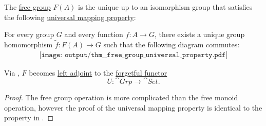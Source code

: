 \begin{theorem}\label{thm:free_group_universal_property}
  The \hyperref[def:free_group]{free group} \( F(A) \) is the unique up to an isomorphism group that satisfies the following \hyperref[rem:universal_mapping_property]{universal mapping property}:
  \begin{displayquote}
    For every group \( G \) and every function \( f: A \to G \), there exists a unique group homomorphism \( \widetilde{f}: F(A) \to G \) such that the following diagram commutes:
    \begin{equation}\label{eq:thm:free_group_universal_property/diagram}
      \begin{aligned}
        \texttt{[image: output/thm\_\_free\_group\_universal\_property.pdf]}
      \end{aligned}
    \end{equation}
  \end{displayquote}

  Via , \( F \) becomes \hyperref[def:category_adjunction]{left adjoint} to the \hyperref[def:concrete_category]{forgetful functor}
  \begin{equation*}
    U: \cat{Grp} \to \cat{Set}.
  \end{equation*}
\end{theorem}
\begin{proof}
  The free group operation is more complicated than the free monoid operation, however the proof of the universal mapping property is identical to the property in .
\end{proof}

